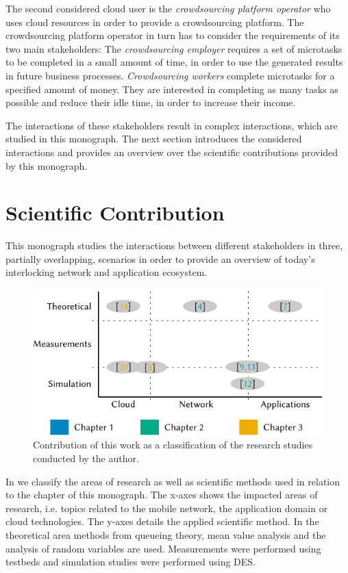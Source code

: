 The second considered cloud user is the \emph{crowdsourcing platform operator} who uses cloud resources in order to provide a crowdsourcing platform.
The crowdsourcing platform operator in turn has to consider the requirements of its two main stakeholders:
The \emph{crowdsourcing employer} requires a set of microtasks to be completed in a small amount of time, in order to use the generated results in future business processes. 
\emph{Crowdsourcing workers} complete microtasks for a specified amount of money.
They are interested in completing as many tasks as possible and reduce their idle time, in order to increase their income.

The interactions of these stakeholders result in complex interactions, which are studied in this monograph.
The next section introduces the considered interactions and provides an overview over the scientific contributions provided by this monograph.

\section{Scientific Contribution}\label{sec:introduction:scientific_contribution}
This monograph studies the interactions between different stakeholders in three, partially overlapping, scenarios in order to provide an overview of today's interlocking network and application ecosystem.

\begin{figure}
\centering
\includegraphics{figures/publications}
\caption{Contribution of this work as a classification of the research studies conducted by the author.}\label{fig:introduction:publications}
\end{figure}

In  we classify the areas of research as well as scientific methods used in relation to the chapter of this monograph.
The x-axes shows the impacted areas of research, i.e. topics related to the mobile network, the application domain or cloud technologies.
The y-axes details the applied scientific method.
In the theoretical area methods from queueing theory, mean value analysis and the analysis of random variables are used.
Measurements were performed using testbeds and simulation studies were performed using \gls{DES}.

